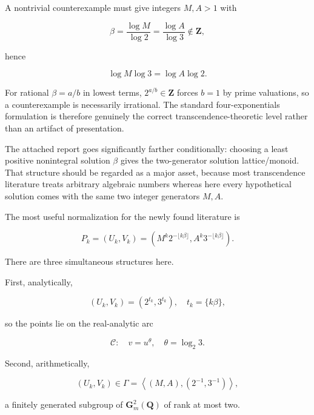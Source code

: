 \documentclass[10pt]{article}
\begin{document}
A nontrivial counterexample must give integers $M, A>1$ with

$$
\beta=\frac{\log M}{\log 2}=\frac{\log A}{\log 3} \notin \mathbf{Z},
$$

hence


\begin{equation*}
\log M \log 3=\log A \log 2 . \tag{1}
\end{equation*}


For rational $\beta=a / b$ in lowest terms, $2^{a / b} \in \mathbf{Z}$ forces $b=1$ by prime valuations, so a counterexample is necessarily irrational. The standard four-exponentials formulation is therefore genuinely the correct transcendence-theoretic level rather than an artifact of presentation.

The attached report goes significantly farther conditionally: choosing a least positive nonintegral solution $\beta$ gives the two-generator solution lattice/monoid. That structure should be regarded as a major asset, because most transcendence literature treats arbitrary algebraic numbers whereas here every hypothetical solution comes with the same two integer generators $M, A$.

The most useful normalization for the newly found literature is


\begin{equation*}
P_{k}=\left(U_{k}, V_{k}\right)=\left(M^{k} 2^{-\lfloor k \beta\rfloor}, A^{k} 3^{-\lfloor k \beta\rfloor}\right) . \tag{2}
\end{equation*}


There are three simultaneous structures here.

First, analytically,

$$
\left(U_{k}, V_{k}\right)=\left(2^{t_{k}}, 3^{t_{k}}\right), \quad t_{k}=\{k \beta\},
$$

so the points lie on the real-analytic arc


\begin{equation*}
\mathcal{C}: \quad v=u^{\theta}, \quad \theta=\log _{2} 3 . \tag{3}
\end{equation*}


Second, arithmetically,


\begin{equation*}
\left(U_{k}, V_{k}\right) \in \Gamma=\left\langle(M, A),\left(2^{-1}, 3^{-1}\right)\right\rangle, \tag{4}
\end{equation*}


a finitely generated subgroup of $\mathbf{G}_{m}^{2}(\mathbf{Q})$ of rank at most two.
\end{document}
